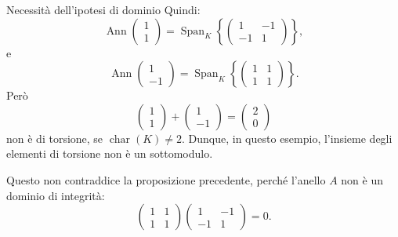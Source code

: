 \documentclass[a4paper]{article}
\begin{document}
\begin{radioactive}
\begin{snippetexample}{Necessità dell'ipotesi di dominio}
    Quindi:
    \[
        \operatorname{Ann}
        \begin{pmatrix}
            1\\
            1
        \end{pmatrix}
        =
        \operatorname{Span}_K
        \left\{
            \begin{pmatrix}
                1 & -1\\
                -1 & 1
            \end{pmatrix}
        \right\},
    \]
    e
    \[
        \operatorname{Ann}
        \begin{pmatrix}
            1\\
            -1
        \end{pmatrix}
        =
        \operatorname{Span}_K
        \left\{
            \begin{pmatrix}
                1 & 1\\
                1 & 1
            \end{pmatrix}
        \right\}.
    \]
    Però
    \[
        \begin{pmatrix}
            1\\
            1
        \end{pmatrix}
        +
        \begin{pmatrix}
            1\\
            -1
        \end{pmatrix}
        =
        \begin{pmatrix}
            2\\
            0
        \end{pmatrix}
    \]
    non è di torsione, se \(\operatorname{char}(K)\neq 2\).
    Dunque, in questo esempio, l'insieme degli elementi di torsione non è un sottomodulo.

    Questo non contraddice la proposizione precedente, perché l'anello \(A\) non è un dominio di integrità:
    \[
        \begin{pmatrix}
            1 & 1\\
            1 & 1
        \end{pmatrix}
        \begin{pmatrix}
            1 & -1\\
            -1 & 1
        \end{pmatrix}
        =
        0.
    \]
\end{snippetexample}
\end{radioactive}
\end{document}
